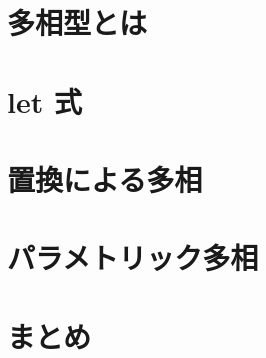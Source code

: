 


\section{多相型とは}



\section{let 式}



\section{置換による多相}



\section{パラメトリック多相}



\section{まとめ}



